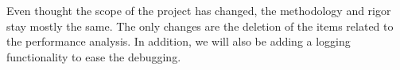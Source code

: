 Even thought the scope of the project has changed, the methodology and rigor stay mostly the same. The only changes are the deletion of the items related to the performance analysis. In addition, we will also be adding a logging functionality to ease the debugging.